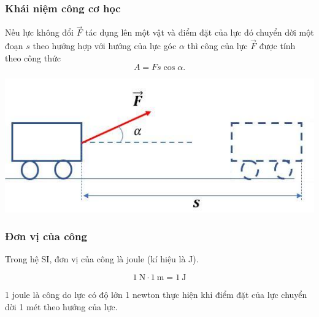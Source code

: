 	\subsubsection{Khái niệm công cơ học}
	Nếu lực không đổi $\vec{F}$ tác dụng lên một vật và điểm đặt của lực đó chuyển dời một đoạn $s$ theo hướng hợp với hướng của lực góc $\alpha$ thì công của lực $\vec{F}$ được tính theo công thức
	\begin{equation*}
		A=Fs\cos \alpha.
	\end{equation*}
	\begin{center}
		\includegraphics[scale=0.6]{../figs/VN10-PH-30-L-022-1-3.jpg}
	\end{center}
	\subsubsection{Đơn vị của công}
	Trong hệ SI, đơn vị của công là joule (kí hiệu là J).
	
	$$1\ \text{N} \cdot 1\ \text{m}= 1\ \text{J}$$
	
	1 joule là công do lực có độ lớn 1 newton thực hiện khi điểm đặt của lực chuyển dời 1 mét theo hướng của lực.

